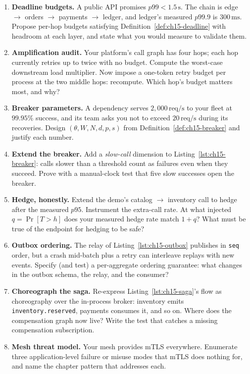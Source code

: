 \begin{enumerate}
  \item \textbf{Deadline budgets.} A public API promises $p99 < 1.5
        \,\mathrm{s}$. The chain is edge $\to$ orders $\to$ payments $\to$
        ledger, and ledger's measured $p99.9$ is $300\,\mathrm{ms}$.
        Propose per-hop budgets satisfying Definition~\ref{def:ch15-deadline}
        with headroom at each layer, and state what you would measure to
        validate them.
  \item \textbf{Amplification audit.} Your platform's call graph has four
        hops; each hop currently retries up to twice with no budget.
        Compute the worst-case downstream load multiplier. Now impose a
        one-token retry budget per process at the two middle hops: recompute.
        Which hop's budget matters most, and why?
  \item \textbf{Breaker parameters.} A dependency serves
        $2{,}000\,\mathrm{req/s}$ to your fleet at $99.95\%$ success, and
        its team asks you not to exceed $20\,\mathrm{req/s}$ during its
        recoveries. Design $(\theta, W, N, d, p, s)$ from
        Definition~\ref{def:ch15-breaker} and justify each number.
  \item \textbf{Extend the breaker.} Add a \emph{slow-call} dimension to
        Listing~\ref{lst:ch15-breaker}: calls slower than a threshold count
        as failures even when they succeed. Prove with a manual-clock test
        that five slow successes open the breaker.
  \item \textbf{Hedge, honestly.} Extend the demo's catalog $\to$ inventory
        call to hedge after the measured $p95$. Instrument the extra-call
        rate. At what injected $q = \Pr[T > h]$ does your measured hedge
        rate match $1 + q$? What must be true of the endpoint for hedging
        to be safe?
  \item \textbf{Outbox ordering.} The relay of
        Listing~\ref{lst:ch15-outbox} publishes in \texttt{seq} order, but
        a crash mid-batch plus a retry can interleave replays with new
        events. Specify (and test) a per-aggregate ordering guarantee:
        what changes in the outbox schema, the relay, and the consumer?
  \item \textbf{Choreograph the saga.} Re-express
        Listing~\ref{lst:ch15-saga}'s flow as choreography over the
        in-process broker: inventory emits \texttt{inventory.reserved},
        payments consumes it, and so on. Where does the compensation graph
        now live? Write the test that catches a missing compensation
        subscription.
  \item \textbf{Mesh threat model.} Your mesh provides mTLS everywhere.
        Enumerate three application-level failure or misuse modes that
        mTLS does nothing for, and name the chapter pattern that addresses
        each.
\end{enumerate}

